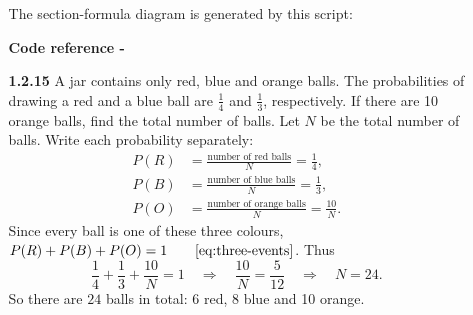 \begin{enumerate}[label={},leftmargin=0pt]
\begin{enumerate}[label={},leftmargin=4mm,itemsep=9pt]
The section-formula diagram is generated by this script:
\par\smallskip
\noindent\textbf{Code reference -}
\par\noindent{}
\par\smallskip
\setcounter{enumii}{15}
\setcounter{equation}{0}
\item[\textbf{1.2.15}] A jar contains only red, blue and orange balls. The probabilities of drawing a red and a blue ball are $\frac14$ and $\frac13$, respectively. If there are 10 orange balls, find the total number of balls.
\solution Let $N$ be the total number of balls. Write each probability separately:
\begin{align*}
P(R)&=\frac{\text{number of red balls}}{N}=\frac14,\\
P(B)&=\frac{\text{number of blue balls}}{N}=\frac13,\\
P(O)&=\frac{\text{number of orange balls}}{N}=\frac{10}{N}.
\end{align*}
Since every ball is one of these three colours, $P(R)+P(B)+P(O)=1\qquad\eqref{eq:three-events}$. Thus
\begin{equation*}
\frac14+\frac13+\frac{10}{N}=1\quad\Longrightarrow\quad\frac{10}{N}=\frac5{12}\quad\Longrightarrow\quad N=24.
\end{equation*}
So there are $24$ balls in total: 6 red, 8 blue and 10 orange.




\end{enumerate}
\end{enumerate}
